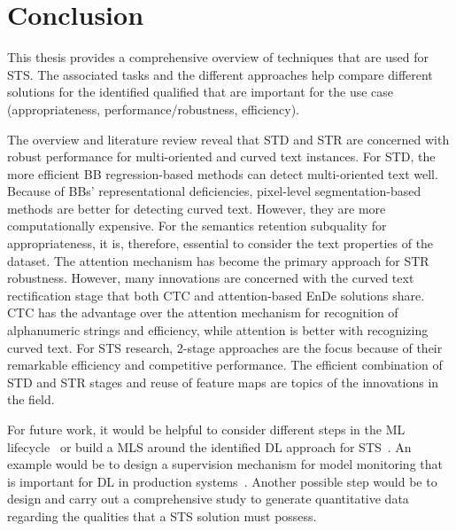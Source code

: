 \chapter{Conclusion}
This thesis provides a comprehensive overview of techniques that are used for \ac{STS}.
The associated tasks and the different approaches help compare different
solutions for the identified qualified that are important for the use case
(appropriateness, performance/robustness, efficiency).

The overview and literature review reveal that \ac{STD} and \ac{STR} are concerned
with robust performance for multi-oriented and curved text instances.
For \ac{STD}, the more efficient \ac{BB} regression-based methods can detect multi-oriented text well.
Because of \acp{BB}' representational deficiencies, pixel-level segmentation-based methods are better for
detecting curved text.
However, they are more computationally expensive.
For the semantics retention subquality for appropriateness, it is, therefore, essential to consider
the text properties of the dataset.
The attention mechanism has become the primary approach for \ac{STR} robustness.
However, many innovations are concerned with the curved text rectification stage that both
\ac{CTC} and attention-based \ac{EnDe} solutions share.
\ac{CTC} has the advantage over the attention mechanism for recognition of alphanumeric strings
and efficiency, while attention is better with recognizing curved text.
For \ac{STS} research, 2-stage approaches are the focus because of their remarkable efficiency and
competitive performance.
The efficient combination of \ac{STD} and \ac{STR} stages and reuse of feature maps are topics
of the innovations in the field.

For future work, it would be helpful to consider different steps in the \ac{ML}
lifecycle~\citep{watanabe_preliminary_2019} or build a \ac{MLS} around the identified \ac{DL}
approach for \ac{STS}~\citep{siebert_construction_2021,nakamichi_requirements-driven_2020}.
An example would be to design a supervision mechanism for model monitoring that is important for
\ac{DL} in production systems~\cite{nakamichi_requirements-driven_2020,watanabe_preliminary_2019}.
Another possible step would be to design and carry out a comprehensive study to generate quantitative
data regarding the qualities that a \ac{STS} solution must possess.
